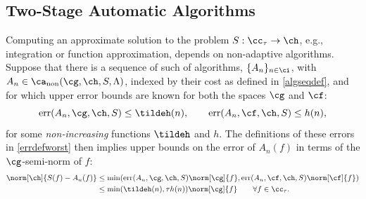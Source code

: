 \documentclass[]{elsarticle}
\DeclareMathOperator{\fix}{non}
\DeclareMathOperator{\err}{err}
\theoremstyle{definition}
\theoremstyle{remark}
\begin{document}
\subsection{Two-Stage Automatic Algorithms}

Computing an approximate solution to the problem $S: \cc_{\tau} \to \ch$, e.g., integration or function approximation, depends on non-adaptive algorithms. Suppose that there is a sequence of such of algorithms, $\{A_n\}_{n \in \ci}$, with $A_n  \in \ca_{\fix}(\cg,\ch,S,\Lambda)$, indexed by their cost as defined in \eqref{algseqdef}, and for which upper error bounds are known for both the spaces $\cg$ and $\cf$:
\begin{equation}\label{algseqerrbd}
\err(A_n,\cg,\ch,S) \le \tildeh(n), \qquad \err(A_n,\cf,\ch,S) \le h(n), 
\end{equation}
for some \emph{non-increasing} functions $\tildeh$ and $h$.  The definitions of these errors in \eqref{errdefworst} then implies upper bounds on the error of $A_n(f)$ in terms of the $\cg$-semi-norm of $f$:
\begin{align} \nonumber
\norm[\ch]{S(f) -  A_n(f)} &\le \min(\err(A_n,\cg,\ch,S)\norm[\cg]{f},\err(A_n,\cf,\ch,S)\norm[\cf]{f}) \\
\label{Anerrbound}
&\le \min(\tildeh(n),\tau h(n))\norm[\cg]{f} \qquad \forall f \in \cc_{\tau}.
\end{align}
\end{document}
